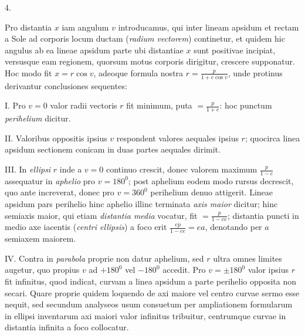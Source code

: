 \begin{center}
4.
\end{center}
Pro distantia $x$ iam angulum $v$ introducamus, qui inter lineam apsidum et rectam a Sole ad corporis locum ductam (\emph{radium vectorem}) continetur, et quidem hic angulus ab ea lineae apsidum parte ubi distantiae $x$ sunt positivae incipiat, versusque eam regionem, quorsum motus corporis dirigitur, crescere supponatur. Hoc modo fit $x=r\cos v$, adeoque formula nostra $r=\frac{p}{1+e\cos v}$, unde protinus derivantur conclusiones sequentes:

I. Pro $v=0$ valor radii vectoris $r$ fit minimum, puta $=\frac{p}{1+e}$: hoc punctum \emph{perihelium} dicitur.

II. Valoribus oppositis ipsius $v$ respondent valores aequales ipsius $r$; quocirca linea apsidum sectionem conicam in duas partes aequales dirimit.

III. In \emph{ellipsi} $r$ inde a $v=0$ continuo crescit, donec valorem maximum $\frac{p}{1-e}$ assequatur in \emph{aphelio} pro $v=180^{0}$; post aphelium eodem modo rursus decrescit, quo ante increverat, donec pro $v=360^{0}$ perihelium denuo attigerit. Lineae apsidum pars perihelio hinc aphelio illinc terminata \emph{axis maior} dicitur; hinc semiaxis maior, qui etiam \emph{distantia media} vocatur, fit $=\frac{p}{1-ee}$; distantia puncti in medio axe iacentis (\emph{centri ellipsis}) a foco erit $\frac{ep}{1-ee}=ea$, denotando per $a$ semiaxem maiorem.

IV. Contra in \emph{parabola} proprie non datur aphelium, sed $r$ ultra omnes limites augetur, quo propius $v$ ad $+180^{0}$ vel $-180^{0}$ accedit. Pro $v=\pm180^{0}$ valor ipsius $r$ fit infinitus, quod indicat, curvam a linea apsidum a parte perihelio opposita non secari. Quare proprie quidem loquendo de axi maiore vel centro curvae sermo esse nequit, sed secundum analyseos usum consuetum per ampliationem formularum in ellipsi inventarum axi maiori valor infinitus tribuitur, centrumque curvae in distantia infinita a foco collocatur.

